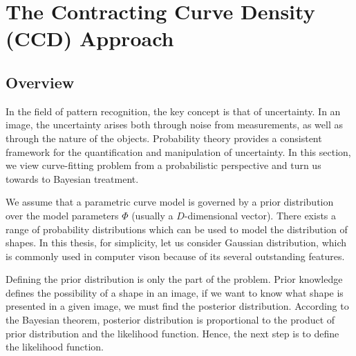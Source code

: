 \section{The Contracting Curve Density (CCD) Approach}
\label{sec:sketch}

\subsection{Overview}
\label{sec:overview}

In the field of pattern recognition, the key concept is that of
uncertainty. In an image, the uncertainty arises both
through noise from measurements, as well as through the nature of
the objects. Probability theory provides a consistent framework for the
quantification and manipulation of uncertainty.  In this section, we
view curve-fitting problem from a probabilistic perspective and turn
us towards to Bayesian treatment.


We assume that a parametric curve model is governed by a prior distribution
over the model parameters $\Phi$ (usually a $D$-dimensional
vector). There exists a range of probability distributions which can
be used to model the distribution of shapes. In this thesis, for
simplicity, let us consider Gaussian distribution, which is commonly
used in computer vison because of its several outstanding features.


Defining the prior distribution is only the part of the problem. Prior knowledge
defines the possibility of a shape in an image, if we want to know what
shape is presented in a given image, we must find the posterior
distribution. According to the Bayesian theorem, posterior distribution
is proportional to the product of prior distribution and the likelihood
function. Hence, the next step is to define the likelihood function.

